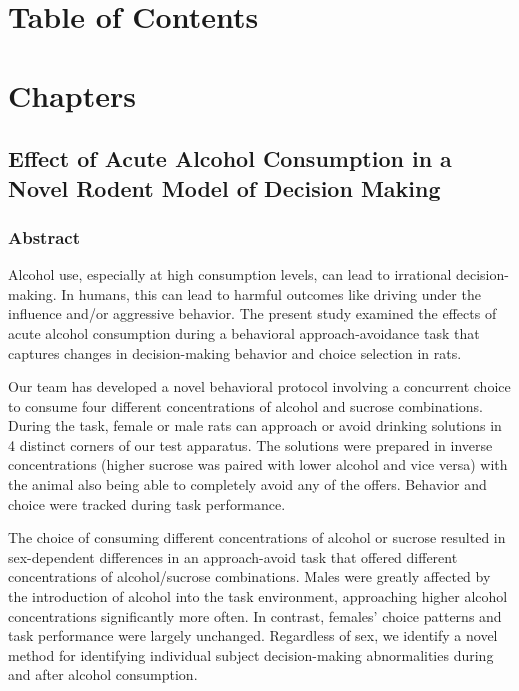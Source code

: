 \documentclass{article}
\begin{document}
\clearpage

\section*{Table of Contents}
\renewcommand{\contentsname}{}
\tableofcontents

\clearpage

\newpage  %
\setcounter{page}{1}  %

\section{Chapters}%
\subsection{Effect of Acute Alcohol Consumption in a Novel Rodent Model of Decision Making}
\subsubsection{Abstract}
Alcohol use, especially at high consumption levels, can lead to irrational decision-making. In humans, this can lead to harmful outcomes like driving under the influence and/or aggressive behavior. The present study examined the effects of acute alcohol consumption during a behavioral approach-avoidance task that captures changes in decision-making behavior and choice selection in rats.

\vspace{1em}

Our team has developed a novel behavioral protocol involving a concurrent choice to consume four different concentrations of alcohol and sucrose combinations. During the task, female or male rats can approach or avoid drinking solutions in 4 distinct corners of our test apparatus. The solutions were prepared in inverse concentrations (higher sucrose was paired with lower alcohol and vice versa) with the animal also being able to completely avoid any of the offers. Behavior and choice were tracked during task performance.
 
\vspace{1em}
 
The choice of consuming different concentrations of alcohol or sucrose resulted in sex-dependent differences in an approach-avoid task that offered different concentrations of alcohol/sucrose combinations. Males were greatly affected by the introduction of alcohol into the task environment, approaching higher alcohol concentrations significantly more often. In contrast, females’ choice patterns and task performance were largely unchanged. Regardless of sex, we identify a novel method for identifying individual subject decision-making abnormalities during and after alcohol consumption. 
 
\end{document}
